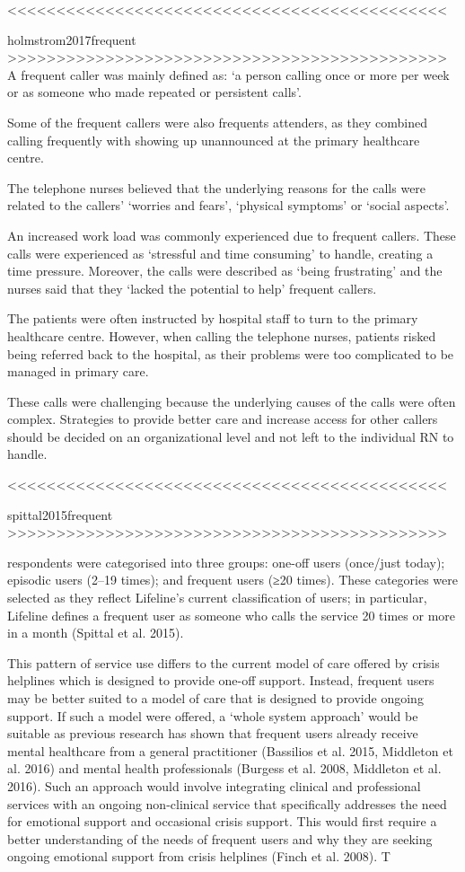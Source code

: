 <<<<<<<<<<<<<<<<<<<<<<<<<<<<<<<<<<<<<<<<<<<<<


holmstrom2017frequent
>>>>>>>>>>>>>>>>>>>>>>>>>>>>>>>>>>>>>>>>>>>>>
A frequent caller was mainly defined as: ‘a person calling once or more per week or as someone who made repeated or persistent calls’.

Some of the frequent callers were also frequents attenders, as they combined calling frequently with showing up unannounced at the primary healthcare centre.

The telephone nurses believed that the underlying reasons for the calls were related to the callers’ ‘worries and fears’, ‘physical symptoms’ or ‘social aspects’.

An increased work load was commonly experienced due to frequent callers. These calls were experienced as ‘stressful and time consuming’ to handle, creating a time pressure. Moreover, the calls were described as ‘being frustrating’ and the nurses said that they ‘lacked the potential to help’ frequent callers.

The patients were often instructed by hospital staff to turn to the primary healthcare centre. However, when calling the telephone nurses, patients risked being referred back to the hospital, as their problems were too complicated to be managed in primary care.

These calls were challenging because the underlying causes of the calls were often complex. Strategies to provide better care and increase access for other callers should be decided on an organizational level and not left to the individual RN to handle.


<<<<<<<<<<<<<<<<<<<<<<<<<<<<<<<<<<<<<<<<<<<<<


spittal2015frequent
>>>>>>>>>>>>>>>>>>>>>>>>>>>>>>>>>>>>>>>>>>>>>

respondents were categorised into three groups: one-off users (once/just today); episodic users (2–19 times); and frequent users (≥20 times). These categories were selected as
they reflect Lifeline’s current classification of users; in particular, Lifeline defines a frequent user as someone who calls the service 20 times or more in a month (Spittal et al. 2015). 

This pattern of service use differs to the current model of care offered by crisis helplines which is designed to provide one-off support. Instead, frequent users may be better suited to a model of care that is designed to provide ongoing support. If such a model were offered, a ‘whole system approach’ would be suitable as previous research has shown that frequent users already receive mental healthcare from a general practitioner (Bassilios et al. 2015, Middleton et al. 2016) and mental health professionals (Burgess et al. 2008, Middleton et al. 2016). Such an approach would involve integrating clinical and professional services with an ongoing non-clinical service that specifically addresses the need for emotional support and occasional crisis support. This would first require a better understanding of the needs of frequent users and why they are seeking ongoing emotional support from crisis helplines (Finch et al. 2008). T


